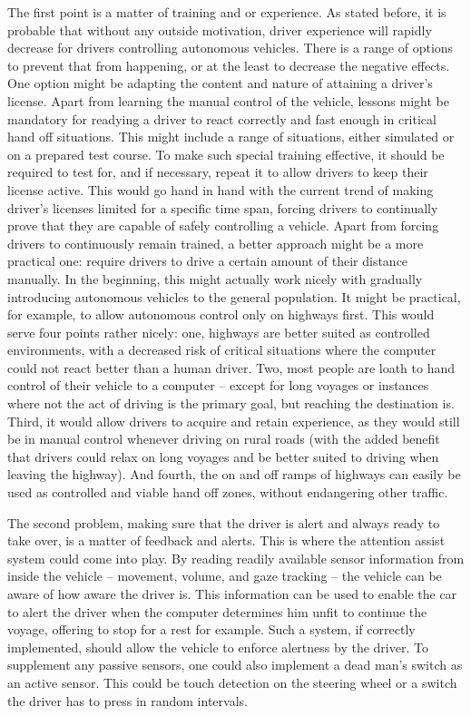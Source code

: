 \documentclass{acm_proc_article-sp}
\begin{document}
The first point is a matter of training and or experience.
As stated before, it is probable that without any outside motivation, driver experience will rapidly decrease for drivers controlling autonomous vehicles.
There is a range of options to prevent that from happening, or at the least to decrease the negative effects.
One option might be adapting the content and nature of attaining a driver's license.
Apart from learning the manual control of the vehicle, lessons might be mandatory for readying a driver to react correctly and fast enough in critical hand off situations.
This might include a range of situations, either simulated or on a prepared test course.
To make such special training effective, it should be required to test for, and if necessary, repeat it to allow drivers to keep their license active.
This would go hand in hand with the current trend of making driver's licenses limited for a specific time span, forcing drivers to continually prove that they are capable of safely controlling a vehicle.
Apart from forcing drivers to continuously remain trained, a better approach might be a more practical one: require drivers to drive a certain amount of their distance manually.
In the beginning, this might actually work nicely with gradually introducing autonomous vehicles to the general population.
It might be practical, for example, to allow autonomous control only on highways first.
This would serve four points rather nicely: one, highways are better suited as controlled environments, with a decreased risk of critical situations where the computer could not react better than a human driver.
Two, most people are loath to hand control of their vehicle to a computer – except for long voyages or instances where not the act of driving is the primary goal, but reaching the destination is.
Third, it would allow drivers to acquire and retain experience, as they would still be in manual control whenever driving on rural roads (with the added benefit that drivers could relax on long voyages and be better suited to driving when leaving the highway).
And fourth, the on and off ramps of highways can easily be used as controlled and viable hand off zones, without endangering other traffic.

The second problem, making sure that the driver is alert and always ready to take over, is a matter of feedback and alerts.
This is where the attention assist system could come into play.
By reading readily available sensor information from inside the vehicle – movement, volume, and gaze tracking – the vehicle can be aware of how aware the driver is.
This information can be used to enable the car to alert the driver when the computer determines him unfit to continue the voyage, offering to stop for a rest for example.
Such a system, if correctly implemented, should allow the vehicle to enforce alertness by the driver.
To supplement any passive sensors, one could also implement a dead man's switch as an active sensor.
This could be touch detection on the steering wheel or a switch the driver has to press in random intervals.
\end{document}
